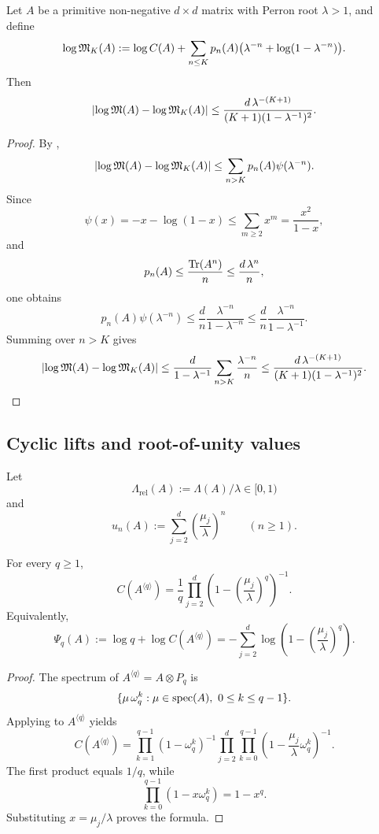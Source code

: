 \begin{theorem}
  \label{thm:logM-truncation-bound}
  Let \(A\) be a primitive non-negative \(d\times d\) matrix with
  Perron root \(\lambda>1\), and define
  \[
    \log\mathfrak{M}_K(A)
    :=\log C(A)
      +\sum_{n\le K}p_n(A)
       \bigl(\lambda^{-n}+\log(1-\lambda^{-n})\bigr).
  \]
  Then
  \[
    \lvert \log\mathfrak{M}(A)-\log\mathfrak{M}_K(A) \rvert
    \le
    \frac{d\,\lambda^{-(K+1)}}{(K+1)(1-\lambda^{-1})^2}.
  \]
\end{theorem}

\begin{proof}
  By ,
  \[
    \lvert \log\mathfrak{M}(A)-\log\mathfrak{M}_K(A) \rvert
    \le \sum_{n>K} p_n(A)\psi(\lambda^{-n}).
  \]
  Since
  \[
    \psi(x)=-x-\log(1-x)\le \sum_{m\ge 2}x^m=\frac{x^2}{1-x},
  \]
  and
  \[
    p_n(A)\le \frac{\operatorname{Tr}(A^n)}{n}\le \frac{d\,\lambda^n}{n},
  \]
  one obtains
  \[
    p_n(A)\psi(\lambda^{-n})
    \le \frac{d}{n}\frac{\lambda^{-n}}{1-\lambda^{-n}}
    \le \frac{d}{n}\frac{\lambda^{-n}}{1-\lambda^{-1}}.
  \]
  Summing over \(n>K\) gives
  \[
    \lvert \log\mathfrak{M}(A)-\log\mathfrak{M}_K(A) \rvert
    \le \frac{d}{1-\lambda^{-1}}
      \sum_{n>K}\frac{\lambda^{-n}}{n}
    \le
    \frac{d\,\lambda^{-(K+1)}}{(K+1)(1-\lambda^{-1})^2}.
  \]
\end{proof}

\subsection{Cyclic lifts and root-of-unity values}

Let
\[
  \Lambda_{\mathrm{rel}}(A):=\Lambda(A)/\lambda\in[0,1)
\]
and
\[
  u_n(A):=\sum_{j=2}^d\left(\frac{\mu_j}{\lambda}\right)^n
  \qquad (n\ge 1).
\]

\begin{theorem}
  \label{thm:finite-part-cyclic-lift-reduced-constant-closed}
  For every \(q\ge 1\),
  \[
    C(A^{\langle q\rangle})
    =\frac{1}{q}\prod_{j=2}^d
      \left(1-\left(\frac{\mu_j}{\lambda}\right)^q\right)^{-1}.
  \]
  Equivalently,
  \[
    \Psi_q(A):=\log q+\log C(A^{\langle q\rangle})
    =-\sum_{j=2}^d
      \log\!\left(1-\left(\frac{\mu_j}{\lambda}\right)^q\right).
  \]
\end{theorem}

\begin{proof}
  The spectrum of \(A^{\langle q\rangle}=A\otimes P_q\) is
  \[
    \{\mu\,\omega_q^k:\mu\in\operatorname{spec}(A),\ 0\le k\le q-1\}.
  \]
  Applying  to
  \(A^{\langle q\rangle}\) yields
  \[
    C(A^{\langle q\rangle})
    =\prod_{k=1}^{q-1}(1-\omega_q^k)^{-1}
      \prod_{j=2}^d\prod_{k=0}^{q-1}
        \left(1-\frac{\mu_j}{\lambda}\omega_q^k\right)^{-1}.
  \]
  The first product equals \(1/q\), while
  \[
    \prod_{k=0}^{q-1}(1-x\omega_q^k)=1-x^q.
  \]
  Substituting \(x=\mu_j/\lambda\) proves the formula.
\end{proof}

